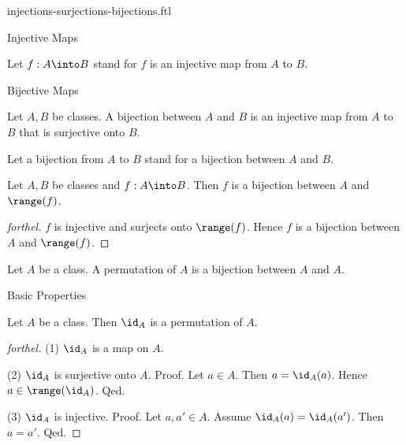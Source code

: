 \documentclass{naproche-library}
\begin{document}
\begin{smodule}[title={Injective, Surjective and Bijective Maps}]{injections-surjections-bijections.ftl}
\begin{sfragment}{Injective Maps}
\begin{definition}[forthel,id=FOUNDATIONS_08_605931408719872]
    Let $f: A \into B$ stand for $f$ is an injective map from $A$ to $B$.
  \end{definition}
\end{sfragment}

\begin{sfragment}{Bijective Maps}
  \begin{definition}[forthel,id=FOUNDATIONS_08_3356670992318464]
    Let $A, B$ be classes.
    A bijection between $A$ and $B$ is an injective map from $A$ to $B$ that is surjective onto $B$.

    Let a bijection from $A$ to $B$ stand for a bijection between $A$ and $B$.
  \end{definition}

  \begin{proposition}[forthel,id=FOUNDATIONS_08_60881194975232]
    Let $A, B$ be classes and $f : A \into B$.
    Then $f$ is a bijection between $A$ and $\range(f)$.
  \end{proposition}
  \begin{proof}[forthel]
    $f$ is injective and surjects onto $\range(f)$.
    Hence $f$ is a bijection between $A$ and $\range(f)$.
  \end{proof}

  \begin{definition}[forthel,id=FOUNDATIONS_08_8188451318923264]
    Let $A$ be a class.
    A permutation of $A$ is a bijection between $A$ and $A$.
  \end{definition}
\end{sfragment}

\begin{sfragment}{Basic Properties}
  \begin{proposition}[forthel,id=FOUNDATIONS_08_7883784041005056]
    Let $A$ be a class.
    Then $\id_{A}$ is a permutation of $A$.
  \end{proposition}
  \begin{proof}[forthel]
    (1) $\id_{A}$ is a map on $A$.

    (2) $\id_{A}$ is surjective onto $A$. \newline
    Proof.
      Let $a \in A$.
      Then $a = \id_{A}(a)$.
      Hence $a \in \range(\id_{A})$.
    Qed.

    (3) $\id_{A}$ is injective. \newline
    Proof.
      Let $a, a' \in A$.
      Assume $\id_{A}(a) = \id_{A}(a')$.
      Then $a = a'$.
    Qed.
  \end{proof}


\end{sfragment}
\end{smodule}
\end{document}
